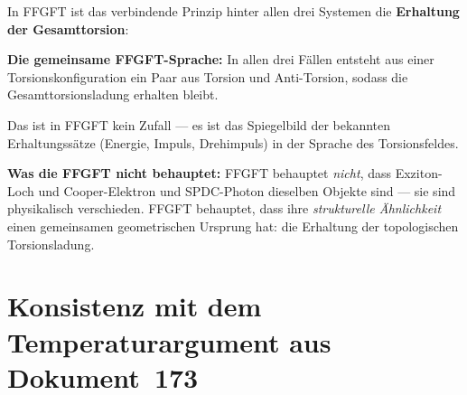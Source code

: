 \begin{foundation}
In FFGFT ist das verbindende Prinzip hinter allen drei Systemen
die \textbf{Erhaltung der Gesamttorsion}:

\begin{center}
\end{center}

\textbf{Die gemeinsame FFGFT-Sprache:}
In allen drei Fällen entsteht aus einer Torsionskonfiguration
ein Paar aus Torsion und Anti-Torsion, sodass die
Gesamttorsionsladung erhalten bleibt.

Das ist in FFGFT kein Zufall --- es ist das Spiegelbild
der bekannten Erhaltungssätze (Energie, Impuls, Drehimpuls)
in der Sprache des Torsionsfeldes.

\textbf{Was die FFGFT nicht behauptet:}
FFGFT behauptet \emph{nicht}, dass Exziton-Loch und
Cooper-Elektron und SPDC-Photon dieselben Objekte sind ---
sie sind physikalisch verschieden.
FFGFT behauptet, dass ihre \emph{strukturelle Ähnlichkeit}
einen gemeinsamen geometrischen Ursprung hat:
die Erhaltung der topologischen Torsionsladung.
\end{foundation}

\section{Konsistenz mit dem Temperaturargument aus Dokument~173}
\label{sec:temperatur}

